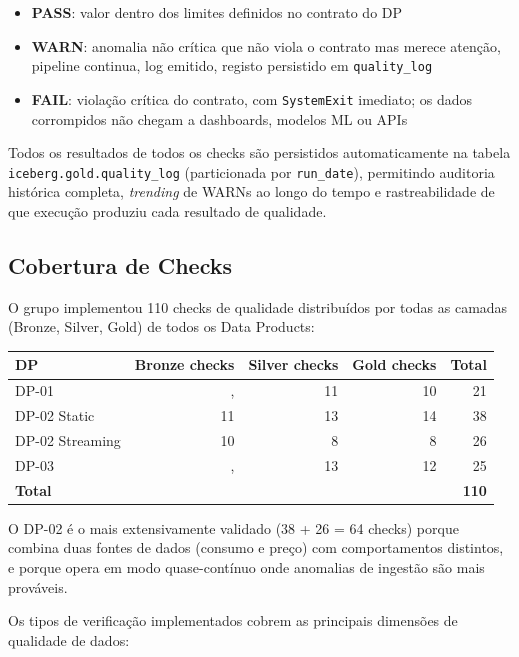 \documentclass[11pt,a4paper]{article}
\begin{document}
\begin{itemize}[leftmargin=*,noitemsep]
  \item \textbf {PASS}: valor dentro dos limites definidos no contrato do DP
  \item \textbf{WARN}: anomalia não crítica que não viola o contrato mas merece atenção, pipeline continua, log emitido, registo persistido em \texttt{quality\_log}
  \item \textbf{FAIL}: violação crítica do contrato, com \texttt{SystemExit} imediato; os dados corrompidos não chegam a dashboards, modelos ML ou APIs
\end{itemize}

Todos os resultados de todos os checks são persistidos automaticamente na tabela \texttt{iceberg.gold.quality\_log} (particionada por \texttt{run\_date}), permitindo auditoria histórica completa, \textit{trending} de WARNs ao longo do tempo e rastreabilidade de que execução produziu cada resultado de qualidade.

\subsection{Cobertura de Checks}

O grupo implementou 110 checks de qualidade distribuídos por todas as camadas (Bronze, Silver, Gold) de todos os Data Products:

\begin{table}[htbp]
\centering
\begin{tabular}{lrrrr}
\toprule
\textbf{DP} & \textbf{Bronze checks} & \textbf{Silver checks} & \textbf{Gold checks} & \textbf{Total} \\
\midrule
DP-01 &, & 11 & 10 & 21 \\
DP-02 Static & 11 & 13 & 14 & 38 \\
DP-02 Streaming & 10 & 8 & 8 & 26 \\
DP-03 &, & 13 & 12 & 25 \\
\midrule
\textbf{Total} & & & & \textbf{110} \\
\bottomrule
\end{tabular}
\end{table}

O DP-02 é o mais extensivamente validado (38 + 26 = 64 checks) porque combina duas fontes de dados (consumo e preço) com comportamentos distintos, e porque opera em modo quase-contínuo onde anomalias de ingestão são mais prováveis.

Os tipos de verificação implementados cobrem as principais dimensões de qualidade de dados:
\end{document}
